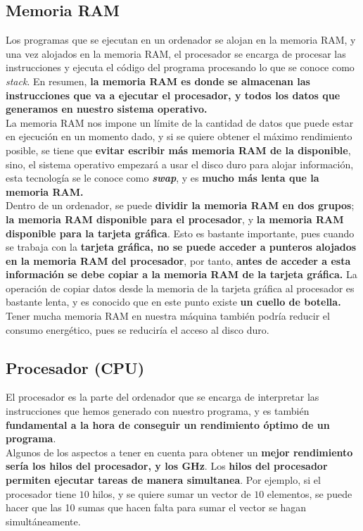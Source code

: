 \subsection{Memoria RAM}
Los programas que se ejecutan en un ordenador se alojan en la memoria RAM, y una vez alojados en la memoria RAM, el procesador se encarga de procesar las instrucciones y ejecuta el código del programa procesando lo que se conoce como \textit{stack}. En resumen, \textbf{la memoria RAM es donde se almacenan las instrucciones que va a ejecutar el procesador, y todos los datos que generamos en nuestro sistema operativo.}
\\ 
La memoria RAM nos impone un límite de la cantidad de datos que puede estar en ejecución en un momento dado, y si se quiere obtener el máximo rendimiento posible, se tiene que \textbf{evitar escribir más memoria RAM de la disponible}, sino, el sistema operativo empezará a usar el disco duro para alojar información, esta tecnología se le conoce como \textbf{\textit{swap}}, y es \textbf{mucho más lenta que la memoria RAM.}
\\ 
Dentro de un ordenador, se puede \textbf{dividir la memoria RAM en dos grupos}; \textbf{la memoria RAM disponible para el procesador}, y  \textbf{la memoria RAM disponible para la tarjeta gráfica}. Esto es bastante importante, pues cuando se trabaja con la \textbf{tarjeta gráfica, no se puede acceder a punteros alojados en la memoria RAM del procesador}, por tanto, \textbf{antes de acceder a esta información se debe copiar a la memoria RAM de la tarjeta gráfica.} La operación de copiar datos desde la memoria de la tarjeta gráfica al procesador es bastante lenta, y es conocido que en este punto existe \textbf{un cuello de botella.}
\\ 
Tener mucha memoria RAM en nuestra máquina también podría reducir el consumo energético, pues se reduciría el acceso al disco duro.

\subsection{Procesador (CPU)}
El procesador es la parte del ordenador que se encarga de interpretar las instrucciones que hemos generado con nuestro programa, y es también \textbf{fundamental a la hora de conseguir un rendimiento óptimo de un programa}. \\
Algunos de los aspectos a tener en cuenta para obtener un \textbf{mejor rendimiento sería los hilos del procesador, y los GHz}. Los \textbf{hilos del procesador permiten ejecutar tareas de manera simultanea}. Por ejemplo, si el procesador tiene $10$ hilos, y se quiere sumar un vector de $10$ elementos, se puede hacer que las 10 sumas que hacen falta para sumar el vector se hagan simultáneamente.

